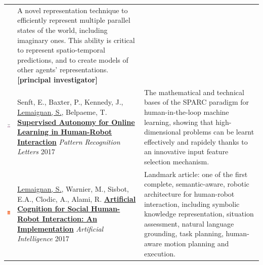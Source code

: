\documentclass[11pt,a4paper]{report}
\begin{document}
\begin{tabular}{p{1.7cm}p{7cm}p{8cm}}
    & \small A novel representation technique to efficiently
    represent multiple parallel states of the world, including imaginary ones.
    This ability is critical to represent spatio-temporal predictions, and to
    create models of other agents' representations.
    \textbf{[principal investigator]}\\



    \vspace{-.20cm}\includegraphics[height=2.2cm]{thumbs/2017-sparc.jpg} &

    Senft, E., Baxter, P., Kennedy, J., \underline{Lemaignan, S.}, Belpaeme, T.
    \newline\href{https://doi.org/10.1016/j.patrec.2017.03.015}{\textbf{Supervised
    Autonomy for Online Learning in Human-Robot Interaction}}
    \newline \textit{Pattern Recognition Letters} 2017
    & \small The mathematical and technical bases of the SPARC
    paradigm for human-in-the-loop machine learning, showing that
    high-dimensional problems can be learnt effectively and rapidely thanks to
    an innovative input feature selection mechanism.
    \textbf{}\\


    \vspace{-.20cm}\includegraphics[height=2.2cm]{thumbs/2017-ai-cover.jpg} &

    \underline{Lemaignan, S.}, Warnier, M., Sisbot, E.A., Clodic, A., Alami, R.
    \newline
    \href{https://doi.org/10.1016/j.artint.2016.07.002}{\textbf{Artificial
    Cognition for Social Human-Robot Interaction: An Implementation}}
    \newline \textit{Artificial Intelligence} 2017
    & \small Landmark article: one of the first complete, semantic-aware, robotic architecture for
    human-robot interaction, including symbolic knowledge representation,
    situation assessment, natural language grounding, task planning, human-aware
    motion planning and execution. \textbf{}\\



\end{tabular}
\end{document}

